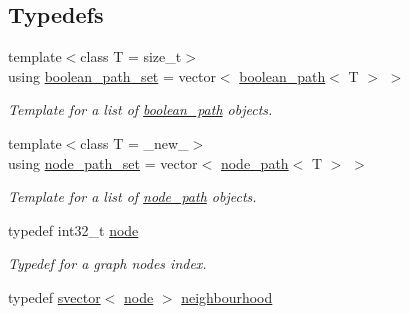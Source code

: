 \subsection*{Typedefs}
\begin{DoxyCompactItemize}
\item 
{\footnotesize template$<$class T  = size\+\_\+t$>$ }\\using \hyperlink{namespacelgraph_1_1utils_aaf50131e15d771a45620336d6e7a77f8}{boolean\+\_\+path\+\_\+set} = vector$<$ \hyperlink{classlgraph_1_1utils_1_1boolean__path}{boolean\+\_\+path}$<$ T $>$ $>$\hypertarget{namespacelgraph_1_1utils_aaf50131e15d771a45620336d6e7a77f8}{}\label{namespacelgraph_1_1utils_aaf50131e15d771a45620336d6e7a77f8}

\begin{DoxyCompactList}\small\item\em Template for a list of \hyperlink{classlgraph_1_1utils_1_1boolean__path}{boolean\+\_\+path} objects. \end{DoxyCompactList}\item 
{\footnotesize template$<$class T  = \+\_\+new\+\_\+$>$ }\\using \hyperlink{namespacelgraph_1_1utils_a723c115f9865edfab11a90377b9abef4}{node\+\_\+path\+\_\+set} = vector$<$ \hyperlink{classlgraph_1_1utils_1_1node__path}{node\+\_\+path}$<$ T $>$ $>$\hypertarget{namespacelgraph_1_1utils_a723c115f9865edfab11a90377b9abef4}{}\label{namespacelgraph_1_1utils_a723c115f9865edfab11a90377b9abef4}

\begin{DoxyCompactList}\small\item\em Template for a list of \hyperlink{classlgraph_1_1utils_1_1node__path}{node\+\_\+path} objects. \end{DoxyCompactList}\item 
typedef int32\+\_\+t \hyperlink{namespacelgraph_1_1utils_ab9c6b34241f0b68372c55f34c460e863}{node}\hypertarget{namespacelgraph_1_1utils_ab9c6b34241f0b68372c55f34c460e863}{}\label{namespacelgraph_1_1utils_ab9c6b34241f0b68372c55f34c460e863}

\begin{DoxyCompactList}\small\item\em Typedef for a graph node\textquotesingle{}s index. \end{DoxyCompactList}\item 
typedef \hyperlink{classlgraph_1_1utils_1_1svector}{svector}$<$ \hyperlink{namespacelgraph_1_1utils_ab9c6b34241f0b68372c55f34c460e863}{node} $>$ \hyperlink{namespacelgraph_1_1utils_a0f2ef47028a466d26841709e705390ac}{neighbourhood}\hypertarget{namespacelgraph_1_1utils_a0f2ef47028a466d26841709e705390ac}{}\label{namespacelgraph_1_1utils_a0f2ef47028a466d26841709e705390ac}


\end{DoxyCompactItemize}
